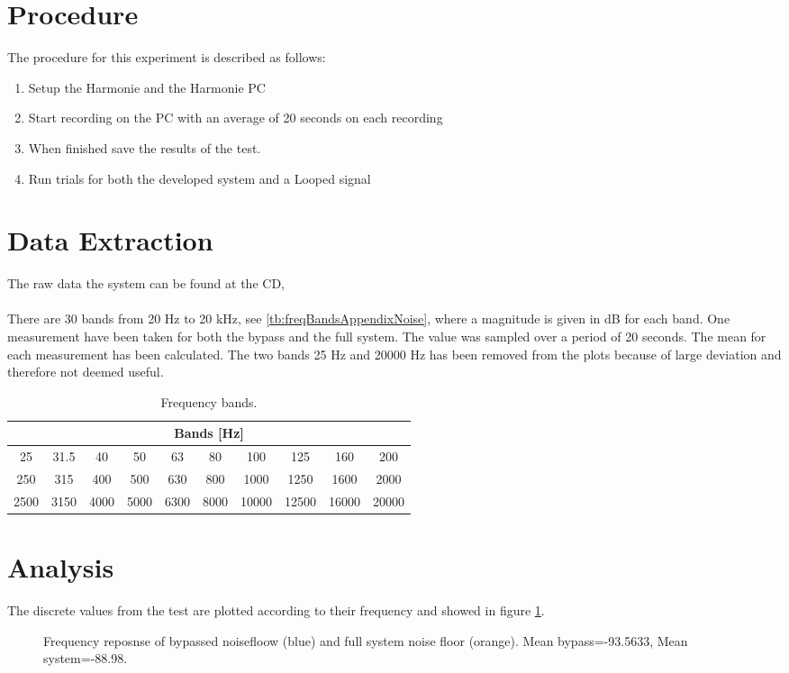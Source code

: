 \section{Procedure}
The procedure for this experiment is described as follows:
\vspace{-5mm}
\begin{enumerate}
\item Setup the Harmonie and the Harmonie PC
\item Start recording on the PC with an average of 20 seconds on each recording
\item When finished save the results of the test.
\item Run trials for both the developed system and a Looped signal
\end{enumerate}

\section{Data Extraction}
The raw data the system can be found at the CD, \\
 \\
There are 30 bands from 20 Hz to 20 kHz, see \autoref{tb:freqBandsAppendixNoise}, where a magnitude is given in dB for each band. One measurement have been taken for both the bypass and the full system. The value was sampled over a period of 20 seconds. The mean for each measurement has been calculated. The two bands 25 Hz and 20000 Hz has been removed from the plots because of large deviation and therefore not deemed useful. 

\begin{table}[H]
\centering
\begin{tabular}{|c|c|c|c|c|c|c|c|c|c|}
\hline
\multicolumn{10}{|c|}{Bands [Hz]}                                       \\ \hline
25   & 31.5 & 40   & 50   & 63   & 80   & 100   & 125   & 160   & 200   \\ \hline
250  & 315  & 400  & 500  & 630  & 800  & 1000  & 1250  & 1600  & 2000  \\ \hline
2500 & 3150 & 4000 & 5000 & 6300 & 8000 & 10000 & 12500 & 16000 & 20000 \\ \hline
\end{tabular}
\caption{Frequency bands.}
\label{tb:freqBandsAppendixNoise}
\end{table}

\section{Analysis}
The discrete values from the test are plotted according to their frequency and showed in figure \ref{fig:FFreqNoiseComp}.
\begin{figure}[H]
	\centering
	
	\caption{Frequency reposnse of bypassed noisefloow (blue) and full system noise floor (orange). Mean bypass=-93.5633, Mean system=-88.98.}
	\label{fig:FFreqNoiseComp}
\end{figure}


